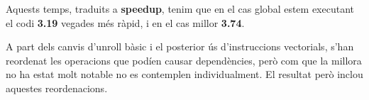 Aquests temps, traduits a \textbf{speedup}, tenim que en el cas global estem executant el codi \textbf{3.19} vegades més ràpid, i en el cas millor \textbf{3.74}.

A part dels canvis d'unroll bàsic i el posterior ús d'instruccions vectorials, s'han reordenat les operacions que podíen causar dependències, però com que la millora no ha estat molt notable no es contemplen individualment. El resultat però inclou aquestes reordenacions.
